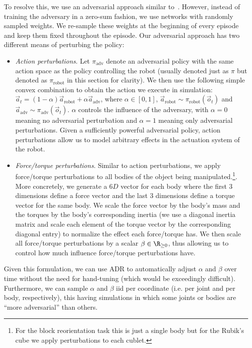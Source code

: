 To resolve this, we use an adversarial approach similar to~\cite{pinto2017supervision, pinto2017robust}. However, instead of training the adversary in a zero-sum fashion, we use networks with randomly sampled weights. We re-sample these weights at the beginning of every episode and keep them fixed throughout the episode. Our adversarial approach has two different means of perturbing the policy:
\begin{itemize}
    \item \emph{Action perturbations}. Let $\pi_{\text{adv}}$ denote an adversarial policy with the same action space as the policy controlling the robot (usually denoted just as $\pi$ but denoted as $\pi_{\text{robot}}$ in this section for clarity). We then use the following simple convex combination to obtain the action we execute in simulation: $\vec{a}_t = (1-\alpha) \vec{a}_{\text{robot}} + \alpha  \vec{a}_{\text{adv}}$, where $\alpha \in [0,1]$, $\vec{a}_{\text{robot}} \sim \pi_{\text{robot}}(\vec{o}_t)$ and $\vec{a}_{\text{adv}} \sim \pi_{\text{adv}}(\vec{o}_t)$. $\alpha$ controls the influence of the adversary, with $\alpha=0$ meaning no adversarial perturbation and $\alpha=1$ meaning only adversarial perturbations. Given a sufficiently powerful adversarial policy, action perturbations allow us to model arbitrary effects in the actuation system of the robot.
    \item \emph{Force/torque perturbations}. Similar to action perturbations, we apply force/torque perturbations to all bodies of the object being manipulated.\footnote{For the block reorientation task this is just a single body but for the Rubik's cube we apply perturbations to each cublet.}. More concretely, we generate a $6D$ vector for each body where the first $3$ dimensions define a force vector and the last $3$ dimensions define a torque vector for the same body. We scale the force vector by the body's mass and the torques by the body's corresponding inertia (we use a diagonal inertia matrix and scale each element of the torque vector by the corresponding diagonal entry) to normalize the effect each force/torque has. We then scale all force/torque perturbations by a scalar $\beta \in \R_{\geq0}$, thus allowing us to control how much influence force/torque perturbations have.
\end{itemize}
Given this formulation, we can use ADR to automatically adjust $\alpha$ and $\beta$ over time without the need for hand-tuning (which would be exceedingly difficult). Furthermore, we can sample $\alpha$ and $\beta$ iid per coordinate (i.e. per joint and per body, respectively), this having simulations in which some joints or bodies are ``more adversarial'' than others.

